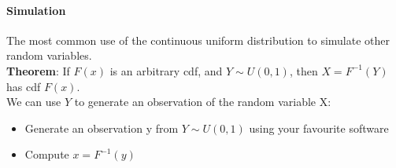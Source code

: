     \paragraph{Simulation}
      The most common use of the continuous uniform distribution to simulate
      other random variables.\\
      \textbf{Theorem}: If $F(x)$ is an arbitrary cdf, and $Y \sim U(0, 1)$,
      then $X = F^{-1}(Y)$ has cdf $F(x)$.\\
      We can use $Y$ to generate an observation of the random variable X:
      \begin{itemize}
        \item Generate an observation y from $Y \sim U(0, 1)$ using your
          favourite software
        \item Compute $x = F^{-1}(y)$
      \end{itemize}

